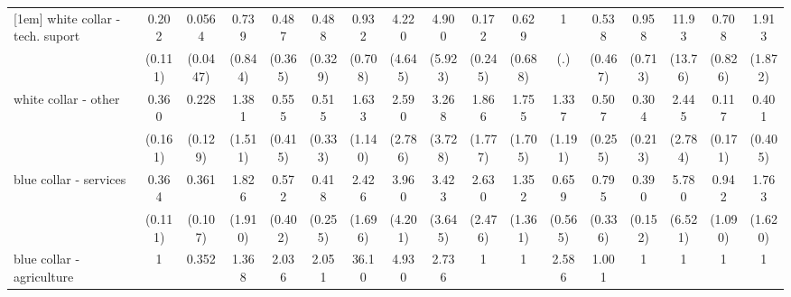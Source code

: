 {\begin{tabular}{l*{16}{c}}
[1em]
white collar - tech. suport&       0.202\sym{**} &      0.0564\sym{***}&       0.739         &       0.487         &       0.488         &       0.932         &       4.220         &       4.900         &       0.172         &       0.629         &           1         &       0.538         &       0.958         &       11.93\sym{*}  &       0.708         &       1.913         \\
                    &     (0.111)         &    (0.0447)         &     (0.844)         &     (0.365)         &     (0.329)         &     (0.708)         &     (4.645)         &     (5.923)         &     (0.245)         &     (0.688)         &         (.)         &     (0.467)         &     (0.713)         &     (13.76)         &     (0.826)         &     (1.872)         \\
[1em]
white collar - other&       0.360\sym{*}  &       0.228\sym{**} &       1.381         &       0.555         &       0.515         &       1.633         &       2.590         &       3.268         &       1.866         &       1.755         &       1.337         &       0.507         &       0.304         &       2.445         &       0.117         &       0.401         \\
                    &     (0.161)         &     (0.129)         &     (1.511)         &     (0.415)         &     (0.333)         &     (1.140)         &     (2.786)         &     (3.728)         &     (1.777)         &     (1.705)         &     (1.191)         &     (0.255)         &     (0.213)         &     (2.784)         &     (0.171)         &     (0.405)         \\
[1em]
blue collar - services&       0.364\sym{***}&       0.361\sym{***}&       1.826         &       0.572         &       0.418         &       2.426         &       3.960         &       3.423         &       2.630         &       1.352         &       0.659         &       0.795         &       0.390\sym{*}  &       5.780         &       0.942         &       1.763         \\
                    &     (0.111)         &     (0.107)         &     (1.910)         &     (0.402)         &     (0.255)         &     (1.696)         &     (4.201)         &     (3.645)         &     (2.476)         &     (1.361)         &     (0.565)         &     (0.336)         &     (0.152)         &     (6.521)         &     (1.090)         &     (1.620)         \\
[1em]
blue collar - agriculture&           1         &       0.352         &       1.368         &       2.036         &       2.051         &       36.10\sym{**} &       4.930         &       2.736         &           1         &           1         &       2.586         &       1.001         &           1         &           1         &           1         &           1         \\

\end{tabular}}
